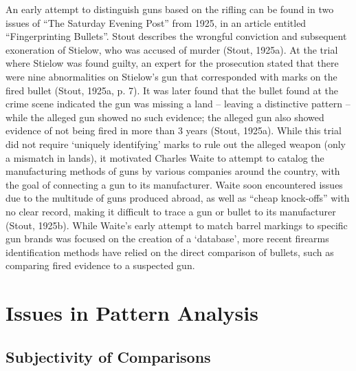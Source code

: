 \documentclass[print]{nuthesis}
\begin{document}
An early attempt to distinguish guns based on the rifling can be found in two issues of ``The Saturday Evening Post'' from 1925, in an article entitled ``Fingerprinting Bullets''.
Stout describes the wrongful conviction and subsequent exoneration of Stielow, who was accused of murder (Stout, 1925a).
At the trial where Stielow was found guilty, an expert for the prosecution stated that there were nine abnormalities on Stielow's gun that corresponded with marks on the fired bullet (Stout, 1925a, p. 7).
It was later found that the bullet found at the crime scene indicated the gun was missing a land -- leaving a distinctive pattern -- while the alleged gun showed no such evidence; the alleged gun also showed evidence of not being fired in more than 3 years (Stout, 1925a).
While this trial did not require `uniquely identifying' marks to rule out the alleged weapon (only a mismatch in lands), it motivated Charles Waite to attempt to catalog the manufacturing methods of guns by various companies around the country, with the goal of connecting a gun to its manufacturer.
Waite soon encountered issues due to the multitude of guns produced abroad, as well as ``cheap knock-offs'' with no clear record, making it difficult to trace a gun or bullet to its manufacturer (Stout, 1925b).
While Waite's early attempt to match barrel markings to specific gun brands was focused on the creation of a `database', more recent firearms identification methods have relied on the direct comparison of bullets, such as comparing fired evidence to a suspected gun.

\hypertarget{issues-in-pattern-analysis}{%
\section{Issues in Pattern Analysis}\label{issues-in-pattern-analysis}}

\hypertarget{subjectivity-of-comparisons}{%
\subsection{Subjectivity of Comparisons}\label{subjectivity-of-comparisons}}
\end{document}
